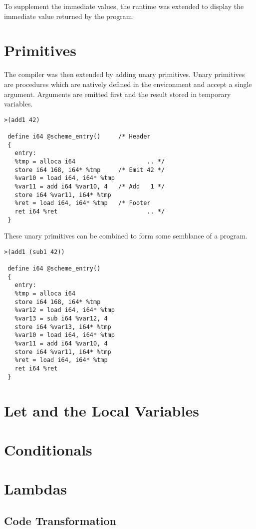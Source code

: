 \documentclass{article}
\begin{document}
To supplement the immediate values, the runtime was extended to display the immediate value returned by the program. 

\section{Primitives}

The compiler was then extended by adding unary primitives. Unary primitives are procedures which are natively defined in the environment and accept a single argument. Arguments are emitted first and the result stored in temporary variables. 

\begin{verbatim}
>(add1 42)

 define i64 @scheme_entry()     /* Header
 {
   entry:
   %tmp = alloca i64                    .. */
   store i64 168, i64* %tmp     /* Emit 42 */ 
   %var10 = load i64, i64* %tmp 
   %var11 = add i64 %var10, 4   /* Add   1 */
   store i64 %var11, i64* %tmp  
   %ret = load i64, i64* %tmp   /* Footer 
   ret i64 %ret                         .. */
 }
\end{verbatim}

These unary  primitives can be combined to form some semblance of a program.

\begin{verbatim}
>(add1 (sub1 42))

 define i64 @scheme_entry()
 {
   entry: 
   %tmp = alloca i64
   store i64 168, i64* %tmp
   %var12 = load i64, i64* %tmp
   %var13 = sub i64 %var12, 4
   store i64 %var13, i64* %tmp
   %var10 = load i64, i64* %tmp
   %var11 = add i64 %var10, 4
   store i64 %var11, i64* %tmp
   %ret = load i64, i64* %tmp
   ret i64 %ret
 }
\end{verbatim}


\section{Let and the Local Variables}

\section{Conditionals}

\section{Lambdas}

\subsection{Code Transformation}
\end{document}
